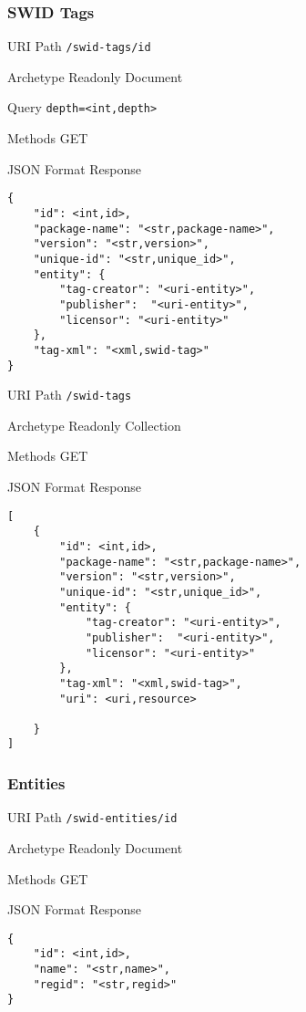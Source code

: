 \documentclass[10pt,a4paper]{scrartcl}
\begin{document}
\pagebreak
\subsubsection{SWID Tags}

\begin{mdframed}[style=def]
\begin{description*}
	\item[URI Path] \texttt{/swid-tags/{id}}
	\item[Archetype] Readonly Document
	\item[Query] \texttt{depth=<int,depth>}
	\item[Methods] GET
	\item[JSON Format Response] \hfill
\begin{lstlisting}
{
	"id": <int,id>,
	"package-name": "<str,package-name>",
	"version": "<str,version>",
	"unique-id": "<str,unique_id>",
	"entity": {
		"tag-creator": "<uri-entity>",
		"publisher":  "<uri-entity>",
		"licensor": "<uri-entity>"
	},
	"tag-xml": "<xml,swid-tag>"
}
\end{lstlisting}
\end{description*}
\end{mdframed}

\begin{mdframed}[style=def]
\begin{description*}
	\item[URI Path] \texttt{/swid-tags}
	\item[Archetype] Readonly Collection
	\item[Methods] GET
	\item[JSON Format Response] \hfill
\begin{lstlisting}
[
	{
		"id": <int,id>,
    	"package-name": "<str,package-name>",
    	"version": "<str,version>",
    	"unique-id": "<str,unique_id>",
    	"entity": {
    		"tag-creator": "<uri-entity>",
    		"publisher":  "<uri-entity>",
    		"licensor": "<uri-entity>"
    	},
    	"tag-xml": "<xml,swid-tag>",
    	"uri": <uri,resource>
    	
	}
]
\end{lstlisting}
\end{description*}
\end{mdframed}


\pagebreak
\subsubsection{Entities}

\begin{mdframed}[style=def]
\begin{description*}
	\item[URI Path] \texttt{/swid-entities/{id}}
	\item[Archetype] Readonly Document
	\item[Methods] GET
	\item[JSON Format Response] \hfill
\begin{lstlisting}
{
	"id": <int,id>,
	"name": "<str,name>",
	"regid": "<str,regid>"
}
\end{lstlisting}
\end{description*}
\end{mdframed}
\end{document}
